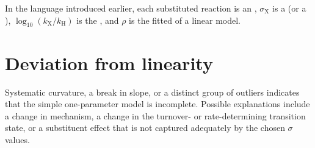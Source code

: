 In the language introduced earlier, each substituted reaction is an , $\sigma_{\mathrm{X}}$ is a  (or a ), $\log_{10}(k_{\mathrm{X}}/k_{\mathrm{H}})$ is the , and $\rho$ is the fitted  of a linear model.

\section{Deviation from linearity}

Systematic curvature, a break in slope, or a distinct group of outliers indicates that the simple one-parameter model is incomplete.
Possible explanations include a change in mechanism, a change in the turnover- or rate-determining transition state, or a substituent effect that is not captured adequately by the chosen $\sigma$ values.


